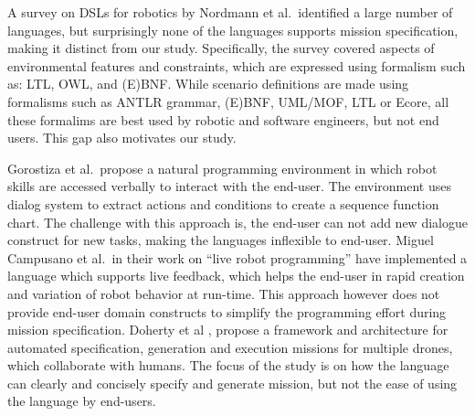 A survey on DSLs for robotics by Nordmann et al.\,\cite{Nordmann2016a} identified a large number of languages, but surprisingly none of the languages supports mission specification, making it distinct from our study.
Specifically, the survey covered aspects of environmental features and constraints, which are expressed using formalism such as: LTL, OWL, and (E)BNF. While scenario definitions are made using formalisms such as ANTLR grammar, (E)BNF, UML/MOF, LTL or Ecore, all these formalims are best used by robotic and software engineers, but not end users. This gap also motivates our study.

Gorostiza et al.\,\cite{Gorostiza2011} propose a natural programming environment in which robot skills are accessed verbally to interact with the end-user. The environment uses dialog system to extract actions and conditions to create a sequence function chart. The challenge with this approach is, the end-user can not add new dialogue construct for new tasks, making the languages inflexible to end-user.
Miguel Campusano et al.\,\cite{campusano.ea:2017:live} in their work on ``live robot programming'' have implemented a language which supports live  feedback, which helps the end-user in rapid creation and variation of robot behavior at run-time. This approach however does not provide end-user domain constructs to simplify the programming effort during mission specification. Doherty et al \cite{Doherty2013}, propose a framework and architecture for automated specification, generation and execution missions for multiple drones, which collaborate with humans. The focus of the study is on how the language can clearly and concisely specify and generate mission, but not the ease of using the language by end-users.
